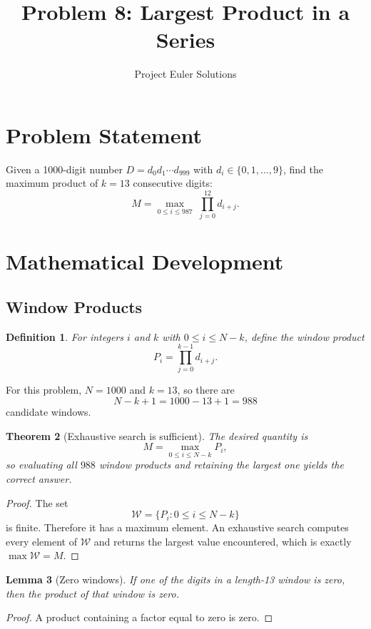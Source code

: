 \documentclass[11pt]{article}
\title{Problem 8: Largest Product in a Series}
\author{Project Euler Solutions}
\date{}
\newtheorem{theorem}{Theorem}
\newtheorem{lemma}[theorem]{Lemma}
\newtheorem{definition}[theorem]{Definition}
\begin{document}
\maketitle

\section{Problem Statement}

Given a 1000-digit number $D = d_0 d_1 \cdots d_{999}$ with $d_i \in \{0, 1, \ldots, 9\}$, find the maximum product of $k = 13$ consecutive digits:
\[
M = \max_{0 \le i \le 987}\; \prod_{j=0}^{12} d_{i+j}.
\]

\section{Mathematical Development}

\subsection{Window Products}

\begin{definition}
For integers $i$ and $k$ with $0 \le i \le N-k$, define the \emph{window product}
\[
P_i = \prod_{j=0}^{k-1} d_{i+j}.
\]
\end{definition}

For this problem, $N = 1000$ and $k = 13$, so there are
\[
N-k+1 = 1000-13+1 = 988
\]
candidate windows.

\begin{theorem}[Exhaustive search is sufficient]\label{thm:exhaustive}
The desired quantity is
\[
M = \max_{0 \le i \le N-k} P_i,
\]
so evaluating all $988$ window products and retaining the largest one yields the correct answer.
\end{theorem}

\begin{proof}
The set
\[
\mathcal{W} = \{P_i : 0 \le i \le N-k\}
\]
is finite. Therefore it has a maximum element. An exhaustive search computes every element of $\mathcal{W}$ and returns the largest value encountered, which is exactly $\max \mathcal{W} = M$.
\end{proof}

\begin{lemma}[Zero windows]
If one of the digits in a length-13 window is zero, then the product of that window is zero.
\end{lemma}

\begin{proof}
A product containing a factor equal to zero is zero.
\end{proof}
\end{document}
